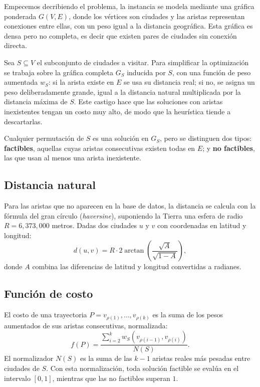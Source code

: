\documentclass[letterpaper,12pt]{article} %
\begin{document}
Empecemos decribiendo el problema, la instancia se modela mediante una gráfica ponderada $G(V, E)$, donde los
vértices son ciudades y las aristas representan conexiones entre ellas, con un
peso igual a la distancia geográfica. Esta gráfica es densa pero {no
completa}, es decir que existen pares de ciudades sin conexión directa.

Sea $S \subseteq V$ el subconjunto de ciudades a visitar. Para simplificar la
optimización se trabaja sobre la gráfica completa $G_S$ inducida por $S$, con
una función de peso aumentada $w_S$: si la arista existe en $E$ se usa su
distancia real; si no, se asigna un peso deliberadamente grande, igual a la
distancia natural multiplicada por la distancia máxima de $S$. Este castigo hace que las soluciones con aristas inexistentes tengan un costo muy alto, de modo que la heurística tiende a descartarlas.

Cualquier permutación de $S$ es una solución en $G_S$, pero se distinguen dos
tipos: \textbf{factibles}, aquellas cuyas aristas consecutivas existen todas en
$E$; y \textbf{no factibles}, las que usan al menos una arista inexistente.

\subsection{Distancia natural}

Para las aristas que no aparecen en la base de datos, la distancia se calcula
con la fórmula del gran círculo (\textit{haversine}), suponiendo la Tierra una
esfera de radio $R = 6{,}373{,}000$ metros. Dadas dos ciudades $u$ y $v$ con
coordenadas en latitud y longitud:
\[
    d(u,v) = R \cdot 2 \arctan\!\left(\frac{\sqrt{A}}{\sqrt{1-A}}\right),
\]
donde $A$ combina las diferencias de latitud y longitud convertidas a radianes.

\subsection{Función de costo}

El costo de una trayectoria $P = v_{\rho(1)}, \dots, v_{\rho(k)}$ es la suma de
los pesos aumentados de sus aristas consecutivas, normalizada:
\[
    f(P) = \frac{\sum_{i=2}^{k} w_S(v_{\rho(i-1)}, v_{\rho(i)})}{N(S)}.
\]
El normalizador $N(S)$ es la suma de las $k-1$ aristas reales más pesadas entre
ciudades de $S$. Con esta normalización, toda solución factible se evalúa en el
intervalo $[0, 1]$, mientras que las no factibles superan $1$.
\end{document}
